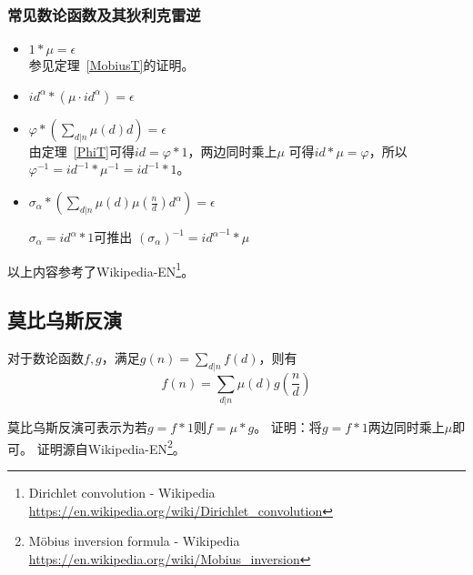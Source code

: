 \subsubsection{常见数论函数及其狄利克雷逆}
\begin{itemize}
	\item $1*\mu=\epsilon$\\
	      参见定理~\ref{MobiusT}的证明。
	\item $id^\alpha*(\mu\cdot id^\alpha)=\epsilon$
	\item $\displaystyle \varphi*(\sum_{d|n}{\mu(d)d})=\epsilon$\\
	      由定理~\ref{PhiT}可得$id=\varphi*1$，两边同时乘上$\mu$
	      可得$id*\mu=\varphi$，所以$\varphi^{-1}=id^{-1}*\mu^{-1}=id^{-1}*1$。
	\item $\sigma_\alpha*(\sum_{d|n}{\mu(d)\mu(\frac{n}{d})d^\alpha})=\epsilon$

	      $\sigma_\alpha=id^\alpha*1$可推出
	      $(\sigma_\alpha)^{-1}={id^\alpha}^{-1}*\mu$
\end{itemize}
以上内容参考了Wikipedia-EN\footnote{Dirichlet convolution - Wikipedia\\
	\url{https://en.wikipedia.org/wiki/Dirichlet\_convolution}}。
\subsection{莫比乌斯反演}
\begin{theorem}
	对于数论函数$f,g$，满足$\displaystyle g(n)=\sum_{d|n}f(d)$，则有
	\begin{displaymath}
		f(n)=\sum_{d|n}\mu(d)g(\frac{n}{d})
	\end{displaymath}
\end{theorem}
莫比乌斯反演可表示为若$g=f*1$则$f=\mu*g$。
证明：将$g=f*1$两边同时乘上$\mu$即可。
证明源自Wikipedia-EN\footnote{Möbius inversion formula - Wikipedia\\
\url{https://en.wikipedia.org/wiki/Mobius_inversion}}。
